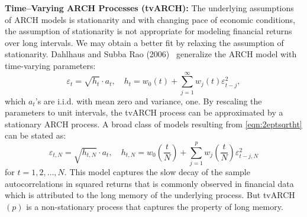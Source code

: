\noindent \textbf{Time--Varying ARCH Processes (tvARCH):} The underlying assumptions of ARCH models is stationarity and with changing pace of economic conditions, the assumption of stationarity is not appropriate for modeling financial returns over long intervals. We may obtain a better fit by relaxing the assumption of stationarity. Dahlhaus and Subba Rao (2006)~\cite{dahlhaus2006} generalize the ARCH model with time-varying parameters:
	\begin{equation} \label{eqn:2eptsqrtht}
	\varepsilon_t = \sqrt{h_t}\cdot a_t, \quad h_t = w_0(t) + \sum_{j=1}^{\infty} w_j(t) \varepsilon_{t-j}^2,
	\end{equation}
which $a_t$'s are i.i.d. with mean zero and variance, one. By rescaling the parameters to unit intervals, the tvARCH process can be approximated by a stationary ARCH process. A broad class of models resulting from \eqref{eqn:2eptsqrtht} can be stated as:
	\begin{equation} \label{eqn:2eptN}
	\varepsilon_{t,N} = \sqrt{h_{t,N}} \cdot a_t, \quad h_{t,N} = w_0 \left( \frac{t}{N} \right) + \sum_{j=1}^pw_j \left (\frac{t}{N} \right) \varepsilon_{t-j,N}^2
	\end{equation}
for $t= 1, 2, \ldots, N$. This model captures the slow decay of the sample autocorrelations in squared returns that is commonly observed in financial data which is attributed to the long memory of the underlying process. But tvARCH$(p)$ is a non-stationary process that captures the property of long memory.


